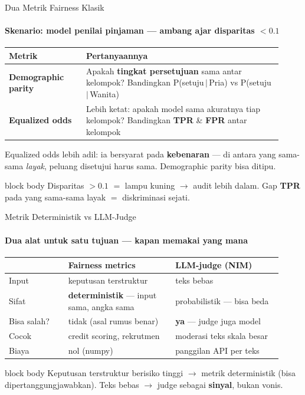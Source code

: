 \documentclass[aspectratio=169,t]{beamer}
\newcommand{\takeaway}[1]{%
  \vspace{0.3em}
  \begin{beamercolorbox}[rounded=true,shadow=false,sep=6pt]{block body}
    \centering\small\color{nvlightgreen}#1
  \end{beamercolorbox}%
}
\begin{document}
\begin{frame}{Dua Metrik Fairness Klasik}
  \framesubtitle{Skenario: model penilai pinjaman --- ambang ajar disparitas $< 0.1$}
  \begin{center}
  \renewcommand{\arraystretch}{1.3}{\footnotesize\setlength{\tabcolsep}{5pt}
  \begin{tabular}{@{}p{0.26\linewidth}p{0.66\linewidth}@{}}
    \toprule \rowcolor{nvcard!50}
    \textbf{Metrik} & \textbf{Pertanyaannya} \\ \midrule
    \textbf{Demographic parity} & Apakah \textbf{tingkat persetujuan} sama antar kelompok? Bandingkan P(setuju\,$|$\,Pria) vs P(setuju\,$|$\,Wanita) \\
    \textbf{Equalized odds} & Lebih ketat: apakah model sama akuratnya tiap kelompok? Bandingkan \textbf{TPR} \& \textbf{FPR} antar kelompok \\
    \bottomrule
  \end{tabular}}
  \end{center}
  \vspace{0.2em}
  \begin{center}\textcolor{nvgray}{\scriptsize Equalized odds lebih adil: ia bersyarat pada \textbf{kebenaran} --- di antara yang sama-sama \emph{layak}, peluang disetujui harus sama. Demographic parity bisa ditipu.}\end{center}
  \takeaway{Disparitas $> 0.1$ $=$ lampu kuning $\to$ audit lebih dalam. Gap \textbf{TPR} pada yang sama-sama layak $=$ diskriminasi sejati.}
\end{frame}

\begin{frame}{Metrik Deterministik vs LLM-Judge}
  \framesubtitle{Dua alat untuk satu tujuan --- kapan memakai yang mana}
  \begin{center}
  \renewcommand{\arraystretch}{1.22}{\footnotesize\setlength{\tabcolsep}{5pt}
  \begin{tabular}{@{}p{0.20\linewidth}p{0.36\linewidth}p{0.36\linewidth}@{}}
    \toprule \rowcolor{nvcard!50}
    & \textbf{Fairness metrics} & \textbf{LLM-judge (NIM)} \\ \midrule
    Input & keputusan terstruktur & teks bebas \\
    Sifat & \textbf{deterministik} --- input sama, angka sama & probabilistik --- bisa beda \\
    Bisa salah? & tidak (asal rumus benar) & \textbf{ya} --- judge juga model \\
    Cocok & credit scoring, rekrutmen & moderasi teks skala besar \\
    Biaya & nol (numpy) & panggilan API per teks \\
    \bottomrule
  \end{tabular}}
  \end{center}
  \takeaway{Keputusan terstruktur berisiko tinggi $\to$ metrik deterministik (bisa dipertanggungjawabkan). Teks bebas $\to$ judge sebagai \textbf{sinyal}, bukan vonis.}
\end{frame}
\end{document}
